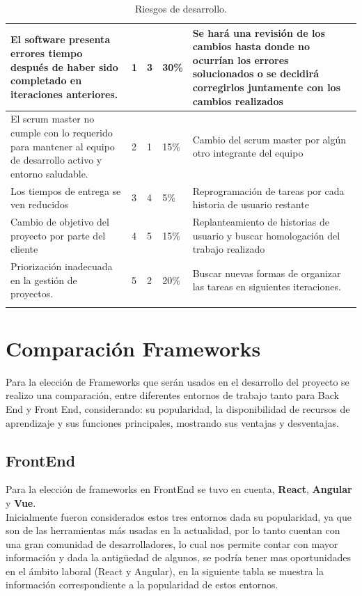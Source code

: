 \documentclass[a4paper,12 pt]{article}
\begin{document}
{\begin{longtable}{|M{4cm}|M{1cm}|M{1.5cm}|M{2.5cm}|M{6cm}|}
    \hline
    El software presenta errores tiempo después de haber sido completado en
    iteraciones anteriores.
    & 1 & 3  & 30\%  
    & Se hará una revisión de los cambios hasta donde no ocurrían los errores
    solucionados o se decidirá corregirlos juntamente con los cambios realizados
    \\
    \hline
    El scrum master no cumple con lo requerido para mantener al equipo de
    desarrollo activo y entorno saludable.
    & 2 & 1  &  15\%
    &  Cambio del scrum master por algún otro integrante del equipo  \\
    \hline
    Los tiempos de entrega se ven reducidos
    & 3 &  4 & 5\%  
    &  Reprogramación de tareas por cada historia de usuario restante \\
    \hline
    Cambio de objetivo del proyecto por parte del cliente
    & 4 & 5  & 15\%  
    & Replanteamiento de historias de usuario y buscar homologación del trabajo
    realizado  \\
    \hline
    Priorización inadecuada en la gestión de proyectos.
    & 5 & 2  & 20\%
    & Buscar nuevas formas de organizar las tareas en siguientes iteraciones. \\
    \hline
    \caption{Riesgos de desarrollo.} 
    \label{Riesgos}
\end{longtable}}
\normalsize

\section {Comparación Frameworks }

Para la elección de Frameworks que serán usados en el desarrollo del proyecto se
realizo una comparación, entre diferentes entornos de trabajo tanto para Back
End y Front End, considerando: su popularidad, la disponibilidad de recursos de
aprendizaje y sus funciones principales, mostrando sus ventajas y desventajas.\\

\subsection{FrontEnd}

Para la elección de frameworks en FrontEnd se tuvo en cuenta, \textbf{React},
\textbf{Angular} y \textbf{Vue}.\\

Inicialmente fueron considerados estos tres entornos dada su popularidad, ya que
son de las herramientas más usadas en la actualidad, por lo tanto cuentan con
una gran comunidad de desarrolladores, lo cual nos permite contar con mayor
información y dada la antigüedad de algunos, se podría tener mas oportunidades
en el ámbito laboral (React y Angular), en la siguiente tabla se muestra la
información correspondiente a la popularidad de estos entornos. 
\end{document}

